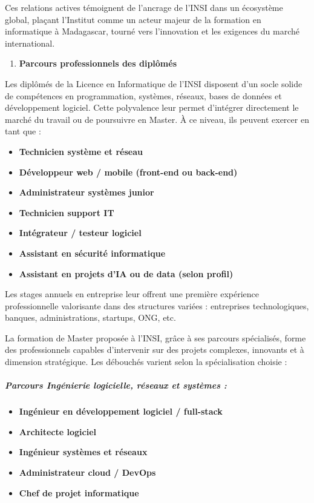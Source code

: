 Ces relations actives témoignent de l'ancrage de l'INSI dans un
écosystème global, plaçant l'Institut comme un acteur majeur de
la formation en informatique à Madagascar, tourné vers l'innovation et
les exigences du marché international.

\begin{enumerate}
	\def\labelenumi{\arabic{enumi}.}
	\item
	\textbf{Parcours professionnels des diplômés}
\end{enumerate}

Les diplômés de la Licence en Informatique de l'INSI disposent d'un
socle solide de compétences en programmation, systèmes, réseaux, bases
de données et développement logiciel. Cette polyvalence leur permet
d'intégrer directement le marché du travail ou de poursuivre en Master.
À ce niveau, ils peuvent exercer en tant que :

\begin{itemize}
	\item
	\textbf{Technicien système et réseau}
	\item
	\textbf{Développeur web / mobile (front-end ou back-end)}
	\item
	\textbf{Administrateur systèmes junior}
	\item
	\textbf{Technicien support IT}
	\item
	\textbf{Intégrateur / testeur logiciel}
	\item
	\textbf{Assistant en sécurité informatique}
	\item
	\textbf{Assistant en projets d'IA ou de data (selon profil)}
\end{itemize}

Les stages annuels en entreprise leur offrent une première expérience
professionnelle valorisante dans des structures variées : entreprises
technologiques, banques, administrations, startups, ONG, etc.

La formation de Master proposée à l'INSI, grâce à ses parcours
spécialisés, forme des professionnels capables d'intervenir sur des
projets complexes, innovants et à dimension stratégique. Les débouchés
varient selon la spécialisation choisie :

\hypertarget{parcours-inguxe9nierie-logicielle-ruxe9seaux-et-systuxe8mes}{%
	\subparagraph{Parcours Ingénierie logicielle, réseaux et systèmes
		:}\label{parcours-inguxe9nierie-logicielle-ruxe9seaux-et-systuxe8mes}}

\begin{itemize}
	\item
	\textbf{Ingénieur en développement logiciel / full-stack}
	\item
	\textbf{Architecte logiciel}
	\item
	\textbf{Ingénieur systèmes et réseaux}
	\item
	\textbf{Administrateur cloud / DevOps}
	\item
	\textbf{Chef de projet informatique}
\end{itemize}

